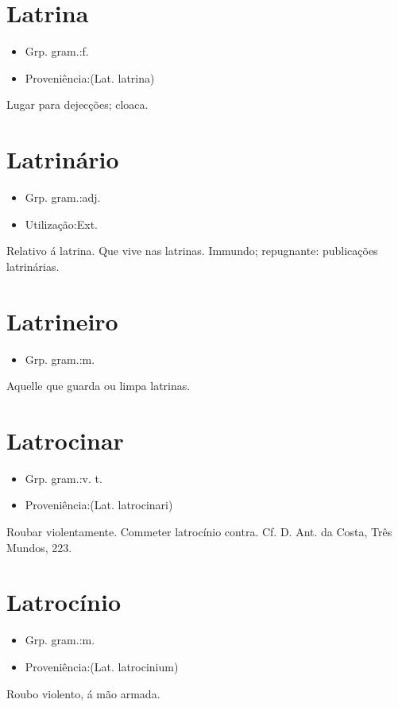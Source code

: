 \section{Latrina}
\begin{itemize}
\item {Grp. gram.:f.}
\end{itemize}
\begin{itemize}
\item {Proveniência:(Lat. \textunderscore latrina\textunderscore )}
\end{itemize}
Lugar para dejecções; cloaca.
\section{Latrinário}
\begin{itemize}
\item {Grp. gram.:adj.}
\end{itemize}
\begin{itemize}
\item {Utilização:Ext.}
\end{itemize}
Relativo á latrina.
Que vive nas latrinas.
Immundo; repugnante: \textunderscore publicações latrinárias\textunderscore .
\section{Latrineiro}
\begin{itemize}
\item {Grp. gram.:m.}
\end{itemize}
Aquelle que guarda ou limpa latrinas.
\section{Latrocinar}
\begin{itemize}
\item {Grp. gram.:v. t.}
\end{itemize}
\begin{itemize}
\item {Proveniência:(Lat. \textunderscore latrocinari\textunderscore )}
\end{itemize}
Roubar violentamente.
Commeter latrocínio contra. Cf. D. Ant. da Costa, \textunderscore Três Mundos\textunderscore , 223.
\section{Latrocínio}
\begin{itemize}
\item {Grp. gram.:m.}
\end{itemize}
\begin{itemize}
\item {Proveniência:(Lat. \textunderscore latrocinium\textunderscore )}
\end{itemize}
Roubo violento, á mão armada.
